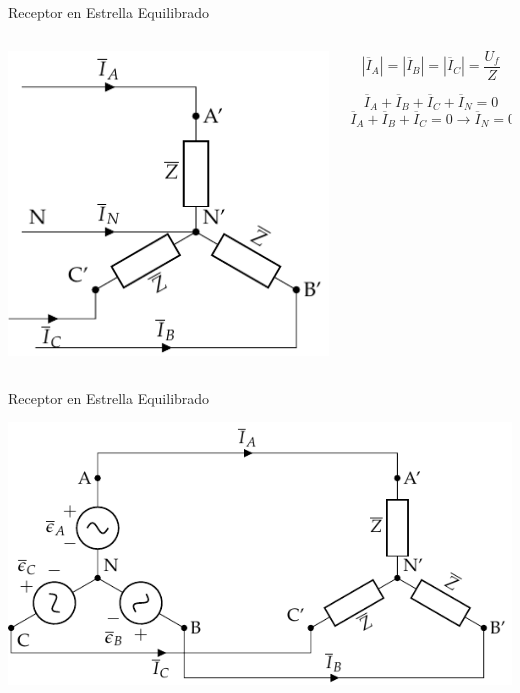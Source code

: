 \documentclass[xcolor={usenames,svgnames,dvipsnames}]{beamer}
\begin{document}
\begin{frame}[label={sec:org46bb63f}]{Receptor en Estrella Equilibrado}
\begin{columns}
\begin{column}{0.5\columnwidth}
\begin{center}
\includegraphics[width=.9\linewidth]{figs/EstrellaEquilibrado_Receptor.pdf}
\end{center}
\end{column}

\begin{column}{0.5\columnwidth}
\[
  \boxed{|\overline{I}_A| = |\overline{I}_B| = |\overline{I}_C| = \frac{U_f}{Z}}
\]

\[
  \overline{I}_A  + \overline{I}_B + \overline{I}_C + \overline{I}_N = 0
\]
\[
   \overline{I}_A  + \overline{I}_B + \overline{I}_C  = 0 \rightarrow \boxed{\overline{I}_N = 0}
\]
\end{column}
\end{columns}
\end{frame}
\begin{frame}[label={sec:org8cf819a}]{Receptor en Estrella Equilibrado}
\begin{center}
\includegraphics[width=.9\linewidth]{figs/EstrellaEquilibrado_SinNeutro.pdf}
\end{center}
\end{frame}
\end{document}
